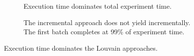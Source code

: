 \begin{figure}[htbp]
    \centering
    \begin{subfigure}[b]{0.45\textwidth}  %
        \centering
        \caption{Execution time dominates total experiment time.}
        \label{fig:et-proportion}
    \end{subfigure}
    \hfill
    \begin{subfigure}[b]{0.45\textwidth}  %
        \centering
        \caption{The incremental approach does not yield incrementally. The first batch completes at 99\% of experiment time.}
        \label{fig:bl-propotrion}
    \end{subfigure}
    \caption{Execution time dominates the Louvain approaches.}
    \label{fig:cd-results-efficency-proportions}
\end{figure}